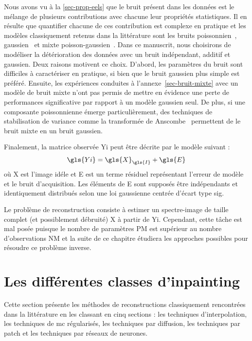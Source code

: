 Nous avons vu à la \cref{sec-prop-eels} que le bruit présent dans les données est le mélange de plusieurs contributions avec chacune leur propriétés statistiques. Il en résulte que quantifier chacune de ces contribution est complexe en pratique et les modèles classiquement retenus dans la littérature sont les bruits poissonnien~\cite{egerton2011electron, mevenkamp2015poisson, stevens2018apl}, gaussien~\cite{stevens2014potential, binev2012compressed} et mixte poisson-gaussien~\cite{sanders2020inpainting}. Dans ce manuscrit, nous choisirons de modéliser la détérioration des données avec un bruit indépendant, additif et gaussien. Deux raisons motivent ce choix. D'abord, les paramètres du bruit sont difficiles à caractériser en pratique, si bien que le bruit gaussien plus simple est préféré. Ensuite, les expériences conduites à l'annexe~\ref{sec-bruit-mixte} avec un modèle de bruit mixte n'ont pas permis de mettre en évidence une perte de performances significative par rapport à un modèle gaussien seul. De plus, si une composante poissonnienne émerge particulièrement, des techniques de stabilisation de variance comme la transformée de Anscombe~\cite{anscombe1948transformation} permettent de  le bruit mixte en un bruit gaussien.

Finalement, la matrice observée \gls{Yi} peut être décrite par le modèle suivant :
\begin{equation}
    \gls{Yi} = \gls{X}_{\gls{I}} + \gls{E}
\end{equation}
où \gls{X} est l'image idéle et \gls{E} est un terme résiduel représentant l'erreur de modèle et le bruit d'acquisition. Les éléments de \gls{E} sont supposés être indépendants et identiquement distribués selon une loi gaussienne centrée d'écart type \gls{sig}.

Le problème de reconstruction consiste à estimer un spectre-image de taille  complet (et possiblement débruité) \gls{X} à partir de \gls{Yi}. Cependant, cette tâche est mal posée puisque le nombre de paramètres \gls{P}\gls{M} est supérieur au nombre d'observations \gls{N}\gls{M} et la suite de ce chapitre étudiera les approches possibles pour résoudre ce problème inverse.


%
\section{Les différentes classes d'inpainting}

Cette section présente les méthodes de reconstructions classiquement rencontrées dans la littérature en les classant en cinq sections : les techniques d'interpolation, les techniques de \gls{mc} régularisés, les techniques par diffusion, les techniques par patch et les techniques par réseaux de neurones.


